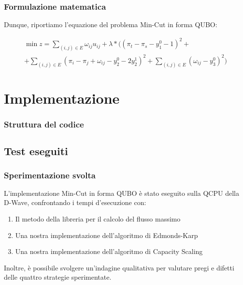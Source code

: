 \documentclass[10pt]{beamer}
\begin{document}
\begin{frame}
  \frametitle{Formulazione matematica}

  Dunque, riportiamo l'equazione del problema Min-Cut in forma QUBO:

  \begin{center}
    \begin{multline*}
        \min z = \sum_{(i, j) \in E} \omega_{ij}u_{ij} + \lambda*((\pi_t - \pi_s - y_1^0 - 1)^2 +
        \\+ \sum_{(i, j) \in E}(\pi_i - \pi_j + \omega_{ij} - y_2^0 - 2y_2^1)^2 + \sum_{(i, j) \in E}(\omega_{ij} - y_3^0)^2)
    \end{multline*}    
\end{center}

\end{frame}

\section{Implementazione}
\begin{frame}
  \frametitle{Struttura del codice}



\end{frame}
\subsection{Test eseguiti}
\begin{frame}
  \frametitle{Sperimentazione svolta}

  L'implementazione Min-Cut in forma QUBO è stato eseguito sulla QCPU della D-Wave, confrontando i tempi d'esecuzione con:
  
  \begin{enumerate}
    \item Il metodo della libreria per il calcolo del flusso massimo
    \item Una nostra implementazione dell'algoritmo di Edmonds-Karp
    \item Una nostra implementazione dell'algoritmo di Capacity Scaling
  \end{enumerate} 

  Inoltre, è possibile svolgere un'indagine qualitativa per valutare pregi e difetti delle quattro strategie sperimentate.

\end{frame}
\end{document}
